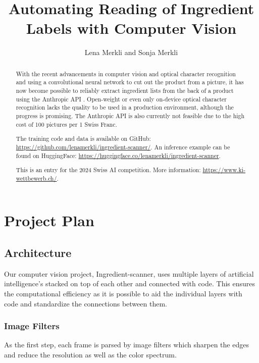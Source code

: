 \documentclass[a4paper,11pt]{report}
\title{Automating Reading of Ingredient Labels with Computer Vision}
\author{Lena Merkli and Sonja Merkli}
\begin{document}
    \maketitle
    
    \begin{abstract}
        With the recent advancements in computer vision and optical character recognition and using a convolutional neural network \cite{he2015deepresiduallearningimage} to cut out the product from a picture, it has now become possible to reliably extract ingredient lists from the back of a product using the Anthropic API \cite{claude3-5sonnet}. Open-weight or even only on-device optical character recognition lacks the quality to be used in a production environment, although the progress is promising. The Anthropic API is also currently not feasible due to the high cost of 100 pictures per 1 Swiss Franc.
        
        The training code and data is available on GitHub: \url{https://github.com/lenamerkli/ingredient-scanner/}. An inference example can be found on HuggingFace: \url{https://huggingface.co/lenamerkli/ingredient-scanner}.
        
        This is an entry for the 2024 Swiss AI competition. More information: \url{https://www.ki-wettbewerb.ch/}.
    \end{abstract}
    
    \tableofcontents

    \chapter{Project Plan}

        \section{Architecture}
                Our computer vision project, Ingredient-scanner, uses multiple layers of artificial intelligence's stacked on top of each other and connected with code. This ensures the computational efficiency as it is possible to aid the individual layers with code and standardize the connections between them.

            \subsection{Image Filters}
                \label{subsec:architecture:filters}
                As the first step, each frame is parsed by image filters which sharpen the edges and reduce the resolution as well as the color spectrum.
\end{document}
